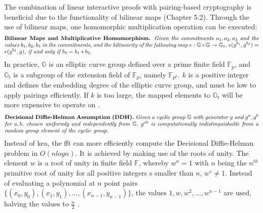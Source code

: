 The combination of linear interactive proofs with pairing-based cryptography is beneficial due to the functionality of bilinear maps (Chapter 5.2). Through the use of bilinear maps, one homomorphic multiplication operation can be executed:
\begin{align*}
    \text{\parbox{450pt}{\textbf{Bilinear Maps and Multiplicative Homomorphism.} \textit{Given the commitments \(a_1, a_2, a_3\) and the values \(b_1, b_2, b_3\) in the commitments, and the bilinearity of the following map \begin{math}
        e: \mathbb{G} \times \mathbb{G} \to \mathbb{G}_t
    \end{math}, \(e(g^{b_1}, g^{b_2}) = e(g^{b_3}, g)\), if and only if \(b_3 = b_1 * b_2\).}}}
\end{align*}
In practice, \begin{math} \mathbb{G} \end{math} is an elliptic curve group defined over a prime finite field \begin{math} \mathbb{F}_p \end{math}, and \begin{math} \mathbb{G}_t \end{math} is a subgroup of the extension field of \begin{math} \mathbb{F}_p \end{math}, namely \begin{math} \mathbb{F}_{p^k} \end{math}. \(k\) is a positive integer and defines the embedding degree of the elliptic curve group, and must be low to apply pairings efficiently. If \(k\) is too large, the mapped elements to \begin{math} \mathbb{G}_t \end{math} will be more expensive to operate on \citep{Thaler}.
\begin{align*}
    \text{\parbox{450pt}{\textbf{Decisional Diffie-Helman Assumption (DDH).} \textit{Given a cyclic group \begin{math}\mathbb{G}\end{math} with generator \(g\) and \(g^a, g^b\) for \(a, b\), chosen uniformly and independently from \begin{math}\mathbb{G}\end{math}, \(g^{ab}\) is computationally indistinguishable from a random group element of the cyclic group.}}}
\end{align*}
Instead of \acrshort{kea}, the \acrshort{fft} can more efficiently compute the Decisional Diffie-Helman problem in \(O(nlogn)\). It is achieved by making use of the roots of unity. The element \(w\) is a root of unity in finite field \begin{math} \mathbb{F}\end{math}, whereby \(w^n = 1\) with \(n\) being the \(n^{th}\) primitive root of unity for all positive integers s smaller than \(n\), \(w^s \neq 1 \). Instead of evaluating a polynomial at \(n\) point pairs \(\{(x_0,y_0), (x_1,y_1), ..., (x_{n-1}, y_{n-1})\}\), the values \(1, w, w^2, ..., w^{n-1}\) are used, halving the values to \(\frac{n}{2}\) \citep{Groth2016OnTS}.

